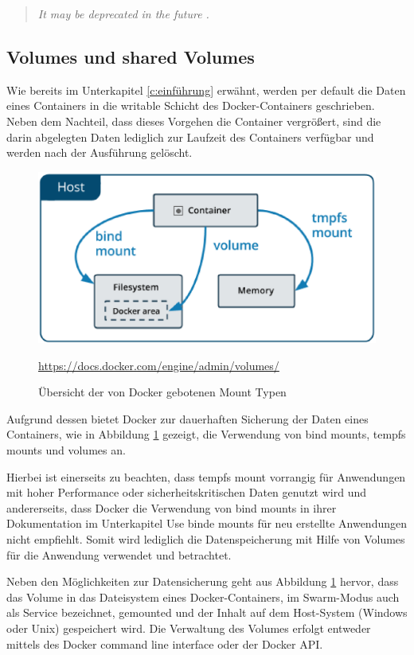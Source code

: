 \begin{quote}
	\textit{\glqq{}It may be deprecated in the future \cite{Docker:online3}.\grqq{}}
\end{quote}

\subsection{Volumes und shared Volumes}

Wie bereits im Unterkapitel \ref{c:einführung} erwähnt, werden per default die Daten eines Containers in die writable Schicht des Docker-Containers geschrieben. 
Neben dem Nachteil, dass dieses Vorgehen die Container vergrößert, sind die darin abgelegten Daten lediglich zur Laufzeit des Containers verfügbar und werden nach der Ausführung gelöscht.

\begin{figure}
	\centering
	\includegraphics[width=0.7\linewidth]{figures/DockerMounts}
	\caption[Docker Mount Typen]{Übersicht der von Docker gebotenen Mount Typen}
	\label{fig:dockermounts}
	\tiny{\quelle\url{https://docs.docker.com/engine/admin/volumes/}}
\end{figure}

Aufgrund dessen bietet Docker zur dauerhaften Sicherung der Daten eines Containers, wie in Abbildung \ref{fig:dockermounts} gezeigt, die Verwendung von bind mounts, tempfs mounts und volumes an.

Hierbei ist einerseits zu beachten, dass tempfs mount vorrangig für Anwendungen mit hoher Performance oder sicherheitskritischen Daten genutzt wird und andererseits, dass Docker die Verwendung von bind mounts in ihrer Dokumentation im Unterkapitel Use binde mounts für neu erstellte Anwendungen nicht empfiehlt. 
Somit wird lediglich die Datenspeicherung mit Hilfe von Volumes für die Anwendung verwendet und betrachtet.

Neben den Möglichkeiten zur Datensicherung geht aus Abbildung \ref{fig:dockermounts} hervor, dass das Volume in das Dateisystem eines Docker-Containers, im Swarm-Modus auch als Service bezeichnet, gemounted und der Inhalt auf dem Host-System (Windows oder Unix) gespeichert wird. 
Die Verwaltung des Volumes erfolgt entweder mittels des Docker command line interface oder der Docker API.

